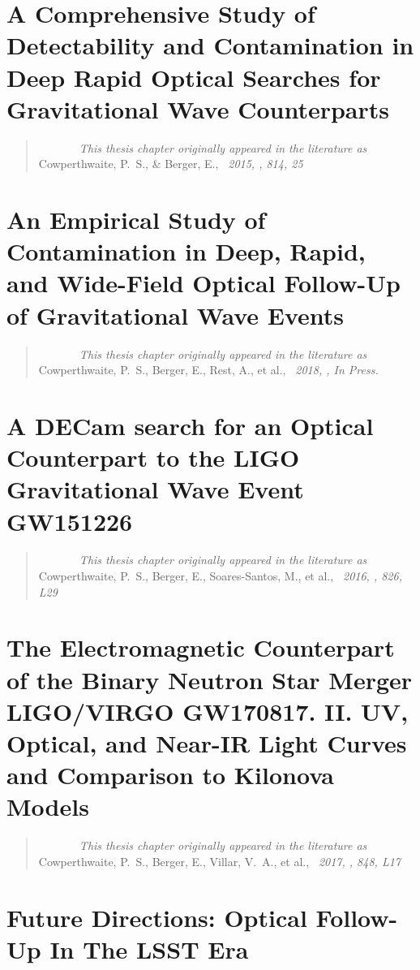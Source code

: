 \documentclass[bound]{hvdthesis}
\begin{document}
\chapter{A Comprehensive Study of Detectability and Contamination in Deep Rapid Optical Searches for Gravitational Wave Counterparts}\label{c:occ}
\begin{quote}
{\em ~~~~~~~This thesis chapter originally appeared in the literature as} \\
{Cowperthwaite, P.~S., \& Berger, E.,
{\em \ 2015, \apj, 814, 25}}
\end{quote}

\clearpage
%
\chapter{An Empirical Study of Contamination in Deep, Rapid, and Wide-Field Optical Follow-Up of Gravitational Wave Events}\label{c:occ2}
\begin{quote}
{\em ~~~~~~~This thesis chapter originally appeared in the literature as} \\
{Cowperthwaite, P.~S., Berger, E., Rest, A., et al.,
{\em \ 2018, \apj, In Press.}}
\end{quote}

\clearpage
%
\chapter{A DECam search for an Optical Counterpart to the LIGO Gravitational Wave Event GW151226}\label{c:occ3}
\begin{quote}
{\em ~~~~~~~This thesis chapter originally appeared in the literature as} \\
{Cowperthwaite, P.~S., Berger, E., Soares-Santos, M., et al.,
{\em\ 2016, \apjl, 826, L29}}
\end{quote}

\clearpage
%
\chapter{The Electromagnetic Counterpart of the Binary Neutron Star Merger LIGO/VIRGO GW170817. II. UV, Optical, and Near-IR Light Curves and Comparison to Kilonova Models}\label{c:occ4}
\begin{quote}
{\em ~~~~~~~This thesis chapter originally appeared in the literature as} \\
{Cowperthwaite, P.~S., Berger, E., Villar, V.~A., et al.,
{\em \ 2017, \apjl, 848, L17}}
\end{quote}

\clearpage
%
\chapter{Future Directions: Optical Follow-Up In The LSST Era}\label{c:occ4}


\singlespace


\end{document}
